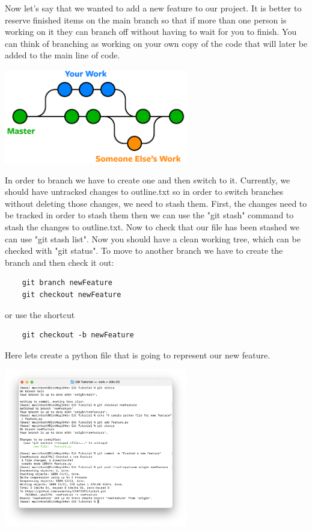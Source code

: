 \documentclass{article}
\begin{document}
Now let's say that we wanted to add a new feature to our project. 
It is better to reserve finished items on the main branch so that if more than one person is working on it they can branch off without having to wait for you to finish. You can think of branching as working on your own copy of the code that will later be added to the main line of code.

\begin{center}
    \includegraphics[width=8cm]{shot3.png}
\end{center}

In order to branch we have to create one and then switch to it. Currently, we should have untracked changes to outline.txt so in order to switch branches without deleting those changes, we need to stash them. First, the changes need to be tracked in order to stash them then we can use the "git stash" command to stash the changes to outline.txt. Now to check that our file has been stashed we can use "git stash list". Now you should have a clean working tree, which can be checked with "git status". To move to another branch we have to create the branch and then check it out:

\begin{verbatim}
    git branch newFeature
    git checkout newFeature
\end{verbatim}
or use the shortcut
\begin{verbatim}
    git checkout -b newFeature
\end{verbatim}

Here lets create a python file that is going to represent our new feature.

\begin{center}
    \includegraphics[width=8cm]{newFeature.png}
\end{center}
\end{document}
